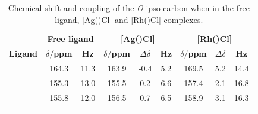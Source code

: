 \begin{table}[htbp]
\caption[Chemical shift and coupling of the \emph{O}-ipso carbon when in the free ligand, [Ag(\tBuxantphos)Cl{]} and [Rh(\tBuxantphos)Cl{]} complexes]{Chemical shift and coupling of the \emph{O}-ipso carbon when in the free ligand, [Ag(\tBuxantphos)Cl] and [Rh(\tBuxantphos)Cl] complexes.}
\vspace{1em}
\label{table:oxygenbindingrh}
\small
\begin{center}
\begin{tabular}{ c c c c c c c c c}
	\toprule{}
	~&\multicolumn{2}{c}{\bfseries{Free ligand}} &\multicolumn{3}{c}{\bfseries{[Ag(\tBuxantphos)Cl]}}&\multicolumn{3}{c}{\bfseries{[Rh(\tBuxantphos)Cl]}}\\  
	\bfseries{Ligand}&\bfseries{$\delta$\carbon{}$/$ppm}&\bfseries{\J{} Hz}&\bfseries{$\delta$\carbon{}$/$ppm}&\bfseries{$\Delta\delta$}&\bfseries{\J{} Hz}&\bfseries{$\delta$\carbon{}$/$ppm}&\bfseries{$\Delta\delta$}&\bfseries{\J{} Hz}\\
	\midrule{}
	\tBusixantphos	&	164.3	& 11.3	&	163.9	& -0.4	& 5.2		& 169.5	& 5.2 	& 14.4 \\
	\tButhixantphos	&	155.3	& 13.0	&	155.5	& 0.2 	& 6.6 	& 157.4	& 2.1 	&16.8 \\
	\tBuxantphos	&	155.8	& 12.0	&	156.5	& 0.7		& 6.5		& 158.9	& 3.1		& 16.3 \\
	\bottomrule{}
\end{tabular}
\end{center}
\end{table}


